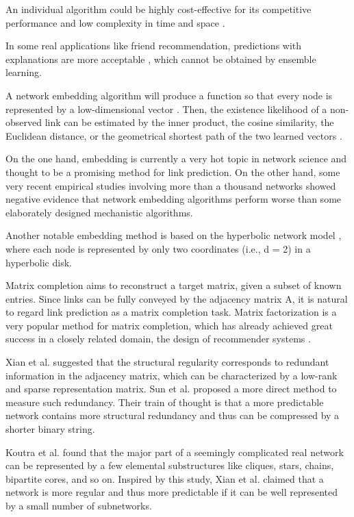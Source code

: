 An individual algorithm could be highly cost-effective for its competitive performance and low complexity in time and space \cite{zhou2021progresses}.

In some real applications like friend recommendation, predictions with explanations are more acceptable \cite{barbieri2014follow}, which cannot be obtained by ensemble learning.


A network embedding algorithm will produce a function so that every node is represented by a low-dimensional vector \cite{cui2018survey}. Then, the existence likelihood of a non-observed link can be estimated by the inner product, the cosine similarity, the Euclidean distance, or the geometrical shortest path of the two learned vectors \cite{cui2018survey, cannistraci2013minimum}.

On the one hand, embedding is currently a very hot topic in network science and thought to be a promising method for link prediction. On the other hand, some very recent empirical studies \cite{muscoloni2022adaptive, mara2020benchmarking, ghasemian2020stacking} involving more than a thousand networks showed negative evidence that network embedding algorithms perform worse than some elaborately designed mechanistic algorithms.

Another notable embedding method is based on the hyperbolic network model \cite{krioukov2010hyperbolic, papadopoulos2012popularity}, where each node is represented by only two coordinates (i.e., d = 2) in a hyperbolic disk.

Matrix completion aims to reconstruct a target matrix, given a subset of known entries. Since links can be fully conveyed by the adjacency matrix A, it is natural to regard link prediction as a matrix completion task. Matrix factorization is a very popular method for matrix completion, which has already achieved great success in a closely related domain, the design of recommender systems \cite{koren2009matrix}.

Xian et al. \cite{xian2020netsre} suggested that the structural regularity corresponds to redundant information in the adjacency matrix, which can be characterized by a low-rank and sparse representation matrix. Sun et al. \cite{sun2020revealing} proposed a more direct method to measure such redundancy. Their train of thought is that a more predictable network contains more structural redundancy and thus can be compressed by a shorter binary string.

Koutra et al. \cite{koutra2015summarizing} found that the major part of a seemingly complicated real network can be represented by a few elemental substructures like cliques, stars, chains, bipartite cores, and so on. Inspired by this study, Xian et al. \cite{xian2020netsre} claimed that a network is more regular and thus more predictable if it can be well represented by a small number of subnetworks. 

